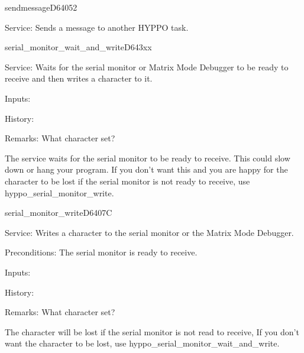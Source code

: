 \newpage
\begin{hyppotrap}{sendmessage}{D640}{52}
\item [Service:]
  Sends a message to another HYPPO task.
\notimplemented
\end{hyppotrap}


\newpage
\begin{hyppotrap}{serial\_monitor\_wait\_and\_write}{D643}{xx}
\item [Service:]
  Waits for the serial monitor or Matrix Mode Debugger to be ready to receive
  and then writes a character to it.
\item [Inputs:]
\item [History:]
\item [Remarks:]
  \TODO{} What character set?

  The service waits for the serial monitor to be ready to receive. This could
  slow down or hang your program. If you don't want this and you are happy for
  the character to be lost if the serial monitor is not ready to receive,
  use hyppo\_serial\_monitor\_write.
\end{hyppotrap}


\newpage
\begin{hyppotrap}{serial\_monitor\_write}{D640}{7C}
\item [Service:]
  Writes a character to the serial monitor or the Matrix Mode Debugger.
\item [Preconditions:]
  The serial monitor is ready to receive.
\item [Inputs:]
\item [History:]
\item [Remarks:]
  \TODO{} What character set?

  The character will be lost if the serial monitor is not read to receive,
  If you don't want the character to be lost, use
  hyppo\_serial\_monitor\_wait\_and\_write.
\end{hyppotrap}


